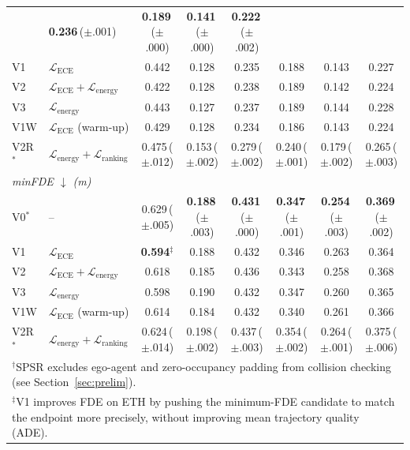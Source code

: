 \documentclass[journal,letterpaper]{IEEEtran}
\begin{document}
\begin{table}[t]
\begin{tabular}{l l c c c c c c}
  & \textbf{0.236}\,\scriptsize{({\tiny$\pm$.001})}
  & \textbf{0.189}\,\scriptsize{({\tiny$\pm$.000})}
  & \textbf{0.141}\,\scriptsize{({\tiny$\pm$.000})}
  & \textbf{0.222}\,\scriptsize{({\tiny$\pm$.002})} \\
V1   & $\mathcal{L}_\text{ECE}$
  & 0.442 & 0.128 & 0.235 & 0.188 & 0.143 & 0.227 \\
V2   & $\mathcal{L}_\text{ECE}{+}\mathcal{L}_\text{energy}$
  & 0.422 & 0.128 & 0.238 & 0.189 & 0.142 & 0.224 \\
V3   & $\mathcal{L}_\text{energy}$
  & 0.443 & 0.127 & 0.237 & 0.189 & 0.144 & 0.228 \\
V1W  & $\mathcal{L}_\text{ECE}$ (warm-up)
  & 0.429 & 0.128 & 0.234 & 0.186 & 0.143 & 0.224 \\
V2R$^*$ & $\mathcal{L}_\text{energy}{+}\mathcal{L}_\text{ranking}$
  & 0.475\,\scriptsize{({\tiny$\pm$.012})}
  & 0.153\,\scriptsize{({\tiny$\pm$.002})}
  & 0.279\,\scriptsize{({\tiny$\pm$.002})}
  & 0.240\,\scriptsize{({\tiny$\pm$.001})}
  & 0.179\,\scriptsize{({\tiny$\pm$.002})}
  & 0.265\,\scriptsize{({\tiny$\pm$.003})} \\
\midrule
\multicolumn{8}{l}{\textit{minFDE $\downarrow$ (m)}} \\[1pt]
V0$^*$  & --
  & 0.629\,\scriptsize{({\tiny$\pm$.005})}
  & \textbf{0.188}\,\scriptsize{({\tiny$\pm$.003})}
  & \textbf{0.431}\,\scriptsize{({\tiny$\pm$.000})}
  & \textbf{0.347}\,\scriptsize{({\tiny$\pm$.001})}
  & \textbf{0.254}\,\scriptsize{({\tiny$\pm$.003})}
  & \textbf{0.369}\,\scriptsize{({\tiny$\pm$.002})} \\
V1   & $\mathcal{L}_\text{ECE}$
  & \textbf{0.594}$^\ddagger$
  & 0.188 & 0.432 & 0.346 & 0.263 & 0.364 \\
V2   & $\mathcal{L}_\text{ECE}{+}\mathcal{L}_\text{energy}$
  & 0.618 & 0.185 & 0.436 & 0.343 & 0.258 & 0.368 \\
V3   & $\mathcal{L}_\text{energy}$
  & 0.598 & 0.190 & 0.432 & 0.347 & 0.260 & 0.365 \\
V1W  & $\mathcal{L}_\text{ECE}$ (warm-up)
  & 0.614 & 0.184 & 0.432 & 0.340 & 0.261 & 0.366 \\
V2R$^*$ & $\mathcal{L}_\text{energy}{+}\mathcal{L}_\text{ranking}$
  & 0.624\,\scriptsize{({\tiny$\pm$.014})}
  & 0.198\,\scriptsize{({\tiny$\pm$.002})}
  & 0.437\,\scriptsize{({\tiny$\pm$.003})}
  & 0.354\,\scriptsize{({\tiny$\pm$.002})}
  & 0.264\,\scriptsize{({\tiny$\pm$.001})}
  & 0.375\,\scriptsize{({\tiny$\pm$.006})} \\
\bottomrule
\multicolumn{8}{l}{{\scriptsize
  $^\dagger$SPSR excludes ego-agent and zero-occupancy padding from
  collision checking (see Section~\ref{sec:prelim}).}} \\
\multicolumn{8}{l}{{\scriptsize
  $^\ddagger$V1 improves FDE on ETH by pushing the minimum-FDE candidate
  to match the endpoint more precisely, without improving mean trajectory
  quality (ADE).}} \\
\end{tabular}
\end{table}
\end{document}
